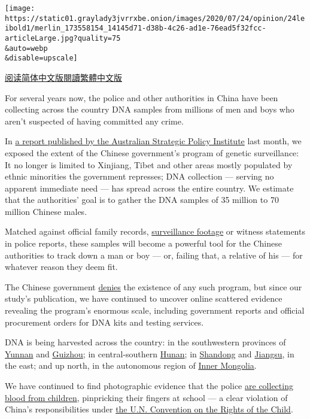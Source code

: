 \texttt{[image: https://static01.graylady3jvrrxbe.onion/images/2020/07/24/opinion/24leibold1/merlin\_173558154\_14145d71-d38b-4c26-ad1e-76ead5f32fcc-articleLarge.jpg?quality=75\\\&auto=webp\\\&disable=upscale]}

\href{https://cn.nytimes3xbfgragh.onion/opinion/20200728/china-dna-police/}{阅读简体中文版}\href{https://cn.nytimes3xbfgragh.onion/opinion/20200728/china-dna-police/zh-hant/}{閱讀繁體中文版}

For several years now, the police and other authorities in China have
been collecting across the country DNA samples from millions of men and
boys who aren't suspected of having committed any crime.

In \href{https://www.aspi.org.au/report/genomic-surveillance}{a report
published by the Australian Strategic Policy Institute} last month, we
exposed the extent of the Chinese government's program of genetic
surveillance: It no longer is limited to Xinjiang, Tibet and other areas
mostly populated by ethnic minorities the government represses; DNA
collection --- serving no apparent immediate need --- has spread across
the entire country. We estimate that the authorities' goal is to gather
the DNA samples of 35 million to 70 million Chinese males.

Matched against official family records,
\href{https://www.wsj.com/articles/twelve-days-in-xinjiang-how-chinas-surveillance-state-overwhelms-daily-life-1513700355}{surveillance
footage} or witness statements in police reports, these samples will
become a powerful tool for the Chinese authorities to track down a man
or boy --- or, failing that, a relative of his --- for whatever reason
they deem fit.

The Chinese government
\href{https://www.globaltimes.cn/content/1193942.shtml}{denies} the
existence of any such program, but since our study's publication, we
have continued to uncover online scattered evidence revealing the
program's enormous scale, including government reports and official
procurement orders for DNA kits and testing services.

DNA is being harvested across the country: in the southwestern provinces
of \href{https://archive.is/9JEPP}{Yunnan} and
\href{http://archive.vn/uUHW8}{Guizhou}; in central-southern
\href{https://archive.is/0I3zd}{Hunan}; in
\href{http://archive.vn/zGN8C}{Shandong} and
\href{http://archive.vn/p8BLE}{Jiangsu}, in the east; and up north, in
the autonomous region of \href{https://archive.is/idqI0}{Inner
Mongolia}.

We have continued to find photographic evidence that the police
\href{https://archive.is/E7xQ9}{are collecting blood from children},
pinpricking their fingers at school --- a clear violation of China's
responsibilities under
\href{https://treaties.un.org/doc/Treaties/1990/09/19900902\%2003-14\%20AM/Ch_IV_11p.pdf}{the
U.N. Convention on the Rights of the Child}.

